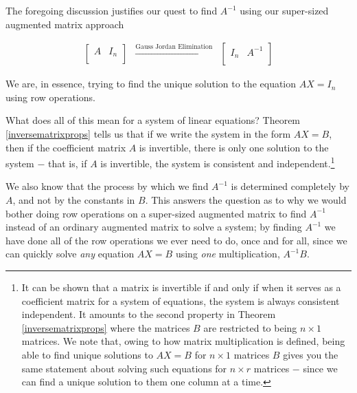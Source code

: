 \documentclass{ximera}
\begin{document}
The foregoing discussion justifies our quest to find $A^{-1}$ using our super-sized augmented matrix approach
 
\[ \begin{array}{ccc}

\left[ \begin{array}{c|c} A & I_{n} \\ \end{array} \right]

&
\xrightarrow{\text{Gauss Jordan Elimination}}

&

\left[ \begin{array}{c|c} I_{n} & A^{-1} \\ \end{array} \right] 

\end{array}\]

We are, in essence, trying to find the unique solution to the equation $AX = I_{n}$ using row operations.

\smallskip

What does all of this mean for a system of linear equations?  Theorem \ref{inversematrixprops} tells us that if we write the system in the form $AX=B$, then if the coefficient matrix $A$ is invertible, there is only one solution to the system $-$ that is, if $A$ is invertible, the system is consistent and independent.\footnote{It can be shown that a matrix is invertible if and only if when it serves as a coefficient matrix for a system of equations, the system is always consistent independent. It amounts to the second property in Theorem \ref{inversematrixprops} where the matrices $B$ are restricted to being $n \times 1$ matrices.  We note that, owing to how matrix multiplication is defined, being able to find unique solutions to $AX = B$ for $n \times 1$ matrices $B$ gives you the same statement about solving such equations for $n \times r$ matrices $-$ since we can find a unique solution to them one column at a time.}  

We also know that the process by which we find $A^{-1}$ is determined completely by $A$, and not by the constants in $B$.  This answers the question as to why we would bother doing row operations on a super-sized augmented matrix to find $A^{-1}$ instead of an ordinary augmented matrix to solve a system;  by finding $A^{-1}$ we have done all of the row operations we ever need to do, once and for all, since we can quickly solve \textit{any} equation $AX = B$ using \textit{one} multiplication, $A^{-1}B$.
\end{document}
